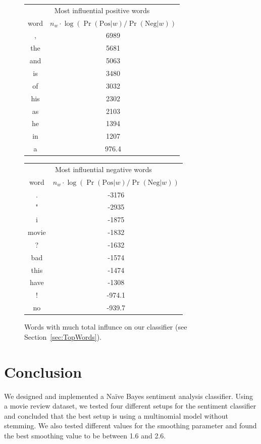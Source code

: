 \documentclass{article}
\newcommand{\PosC}{\mathrm{Pos}}
\newcommand{\NegC}{\mathrm{Neg}}
\begin{document}
\begin{figure}
\begin{tabular}{c|c}
    \multicolumn{2}{c}{Most influential positive words} \\
    word & \(n_w \cdot \log(\Pr(\PosC|w) / \Pr(\NegC|w))\) \\
    \hline
     , & 6989 \\
    the & 5681 \\
    and & 5063 \\
    is & 3480 \\
    of & 3032 \\
    his & 2302 \\
    as & 2103 \\
    he & 1394 \\
    in & 1207 \\
    a & 976.4
\end{tabular}
\begin{tabular}{c|c}
    \multicolumn{2}{c}{Most influential negative words} \\
    word & \(n_w \cdot \log(\Pr(\PosC|w) / \Pr(\NegC|w))\) \\
    \hline
    . & -3176 \\
    " & -2935 \\
    i & -1875 \\
    movie & -1832 \\
    ? & -1632 \\
    bad & -1574 \\
    this & -1474 \\
    have & -1308 \\
    ! & -974.1 \\
    no & -939.7
\end{tabular}
\caption{\label{fig:MostInfluentialWords} Words with much total influnce on our classifier (see Section~\ref{sec:TopWords}).}
\end{figure}


\section{Conclusion}
We designed and implemented a Na\"{i}ve Bayes sentiment analysis classifier. Using a movie review dataset, we tested four different setups for the sentiment classifier and concluded that the best setup is using a multinomial model without stemming. We also tested different values for the smoothing parameter and found the best smoothing value to be between 1.6 and 2.6.


{}

\end{document}
